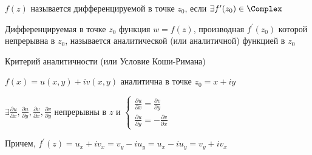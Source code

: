 \hypertarget{derivative}{}

\Def $f(z)$ называется дифференцируемой в точке $z_0$, если $\exists f^\prime(z_0) \in \Complex$

\Defs Дифференцируемая в точке $z_0$ функция $w = f(z)$, производная $f^\prime(z_0)$ которой непрерывна в $z_0$,
называется аналитической (или аналитичной) функцией в $z_0$

\hypertarget{cauchy_riemann}{}

\begin{MyTheorem}
    \Ths Критерий аналитичности (или Условие Коши-Римана)

    \begin{center}
        $f(x) = u(x, y) + i v(x, y)$ аналитична в точке $z_0 = x + iy$ 
        
    
        $\exists \frac{\partial u}{\partial x}, \frac{\partial u}{\partial y}, \frac{\partial v}{\partial x}, \frac{\partial v}{\partial y}$ непрерывны в $z$ и
        $\begin{cases}\frac{\partial u}{\partial x} = \frac{\partial v}{\partial y} \\ \frac{\partial u}{\partial y} = -\frac{\partial v}{\partial x}\end{cases}$
    \end{center}

    Причем, $f^\prime(z) = u_x + i v_x = v_y - i u_y = u_x - i u_y = v_y + i v_x$
\end{MyTheorem}

